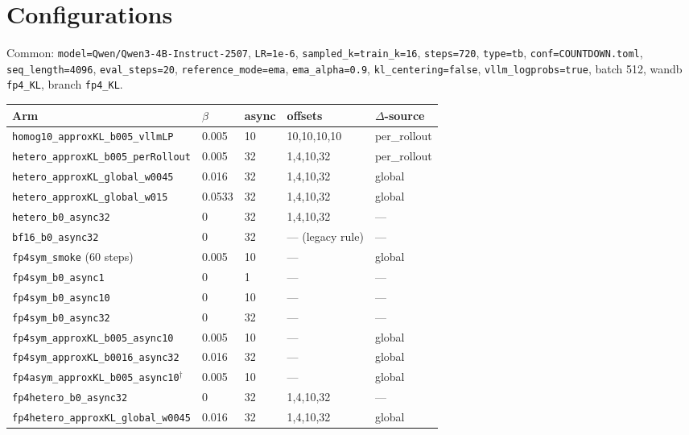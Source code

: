 \documentclass[11pt]{amsart}
\begin{document}
\appendix

\section{Configurations}\label{app:configs}

Common: \texttt{model=Qwen/Qwen3-4B-Instruct-2507}, \texttt{LR=1e-6},
\texttt{sampled\_k=train\_k=16}, \texttt{steps=720}, \texttt{type=tb},
\texttt{conf=COUNTDOWN.toml}, \texttt{seq\_length=4096},
\texttt{eval\_steps=20}, \texttt{reference\_mode=ema}, \texttt{ema\_alpha=0.9},
\texttt{kl\_centering=false}, \texttt{vllm\_logprobs=true}, batch 512, wandb
\texttt{fp4\_KL}, branch \texttt{fp4\_KL}.

\begin{center}
\small
\begin{tabular}{lllll}
\toprule
Arm & $\beta$ & async & offsets & $\Delta$-source \\
\midrule
\texttt{homog10\_approxKL\_b005\_vllmLP} & 0.005 & 10 & 10,10,10,10 & per\_rollout \\
\texttt{hetero\_approxKL\_b005\_perRollout} & 0.005 & 32 & 1,4,10,32 & per\_rollout \\
\texttt{hetero\_approxKL\_global\_w0045} & 0.016 & 32 & 1,4,10,32 & global \\
\texttt{hetero\_approxKL\_global\_w015} & 0.0533 & 32 & 1,4,10,32 & global \\
\texttt{hetero\_b0\_async32} & 0 & 32 & 1,4,10,32 & --- \\
\texttt{bf16\_b0\_async32} & 0 & 32 & --- (legacy rule) & --- \\
\texttt{fp4sym\_smoke} (60 steps) & 0.005 & 10 & --- & global \\
\texttt{fp4sym\_b0\_async1} & 0 & 1 & --- & --- \\
\texttt{fp4sym\_b0\_async10} & 0 & 10 & --- & --- \\
\texttt{fp4sym\_b0\_async32} & 0 & 32 & --- & --- \\
\texttt{fp4sym\_approxKL\_b005\_async10} & 0.005 & 10 & --- & global \\
\texttt{fp4sym\_approxKL\_b0016\_async32} & 0.016 & 32 & --- & global \\
\texttt{fp4asym\_approxKL\_b005\_async10}$^{\dagger}$ & 0.005 & 10 & --- & global \\
\texttt{fp4hetero\_b0\_async32} & 0 & 32 & 1,4,10,32 & --- \\
\texttt{fp4hetero\_approxKL\_global\_w0045} & 0.016 & 32 & 1,4,10,32 & global \\

\end{tabular}
\end{center}
\end{document}
